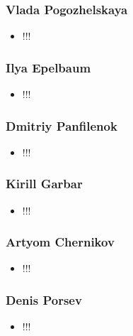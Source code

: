 \documentclass[xcolor=table,aspectratio=169]{beamer}
\begin{document}
\begin{frame}[fragile]
  \frametitle{Vlada Pogozhelskaya}
    \begin{itemize}
      \item !!! 
    \end{itemize}
\end{frame}

\begin{frame}[fragile]
  \frametitle{Ilya Epelbaum}
    \begin{itemize}
      \item !!! 
    \end{itemize}
\end{frame}

\begin{frame}[fragile]
  \frametitle{Dmitriy Panfilenok}
    \begin{itemize}
      \item !!! 
    \end{itemize}
\end{frame}

\begin{frame}[fragile]
  \frametitle{Kirill Garbar}
    \begin{itemize}
      \item !!! 
    \end{itemize}
\end{frame}

\begin{frame}[fragile]
  \frametitle{Artyom Chernikov}
    \begin{itemize}
      \item !!! 
    \end{itemize}
\end{frame}

\begin{frame}[fragile]
  \frametitle{Denis Porsev}
    \begin{itemize}
      \item !!! 
    \end{itemize}
\end{frame}
\end{document}
